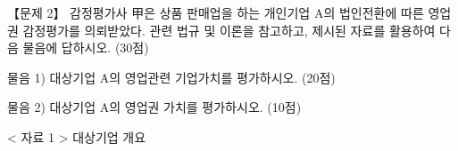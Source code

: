 \begin{longquestion}{【문제 2】}
감정평가사 甲은 상품 판매업을 하는 개인기업 A의 법인전환에 따른 영업권 감정평가를 의뢰받았다. 관련 법규 및 이론을 참고하고, 제시된 자료를 활용하여 다음 물음에 답하시오. (30점) \par
\medskip\noindent 물음 1) 대상기업 A의 영업관련 기업가치를 평가하시오. (20점) \par
\medskip\noindent 물음 2) 대상기업 A의 영업권 가치를 평가하시오. (10점) \par
< 자료 1 > 대상기업 개요 \par
{\small\centering
{}\par}


\end{longquestion}
